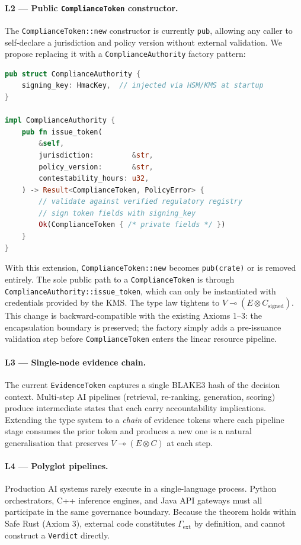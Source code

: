 \paragraph{L2 — Public \texttt{ComplianceToken} constructor.}
The \texttt{ComplianceToken::new} constructor is currently
\texttt{pub}, allowing any caller to self-declare a jurisdiction
and policy version without external validation.
We propose replacing it with a \texttt{ComplianceAuthority}
factory pattern:

\begin{lstlisting}[language=Rust,caption={ComplianceAuthority
  factory (proposed; ~50 LOC)}]
pub struct ComplianceAuthority {
    signing_key: HmacKey,  // injected via HSM/KMS at startup
}

impl ComplianceAuthority {
    pub fn issue_token(
        &self,
        jurisdiction:         &str,
        policy_version:       &str,
        contestability_hours: u32,
    ) -> Result<ComplianceToken, PolicyError> {
        // validate against verified regulatory registry
        // sign token fields with signing_key
        Ok(ComplianceToken { /* private fields */ })
    }
}
\end{lstlisting}

\noindent
With this extension, \texttt{ComplianceToken::new} becomes
\texttt{pub(crate)} or is removed entirely.
The sole public path to a \texttt{ComplianceToken} is through
\texttt{ComplianceAuthority::issue\_token}, which can only be
instantiated with credentials provided by the KMS.
The type law tightens to $V \multimap (E \otimes C_{\text{signed}})$.
This change is backward-compatible with the existing Axioms
1--3: the encapsulation boundary is preserved; the factory
simply adds a pre-issuance validation step before
\texttt{ComplianceToken} enters the linear resource pipeline.

\paragraph{L3 — Single-node evidence chain.}
The current \texttt{EvidenceToken} captures a single BLAKE3 hash
of the decision context.
Multi-step AI pipelines (retrieval, re-ranking, generation,
scoring) produce intermediate states that each carry accountability
implications.
Extending the type system to a \emph{chain} of evidence tokens
where each pipeline stage consumes the prior token and produces
a new one is a natural generalisation that preserves
$V \multimap (E \otimes C)$ at each step.

\paragraph{L4 — Polyglot pipelines.}
Production AI systems rarely execute in a single-language process.
Python orchestrators, C++ inference engines, and Java API gateways
must all participate in the same governance boundary.
Because the theorem holds within Safe Rust (Axiom 3), external
code constitutes $\Gamma_{\text{ext}}$ by definition, and cannot
construct a \texttt{Verdict} directly.


